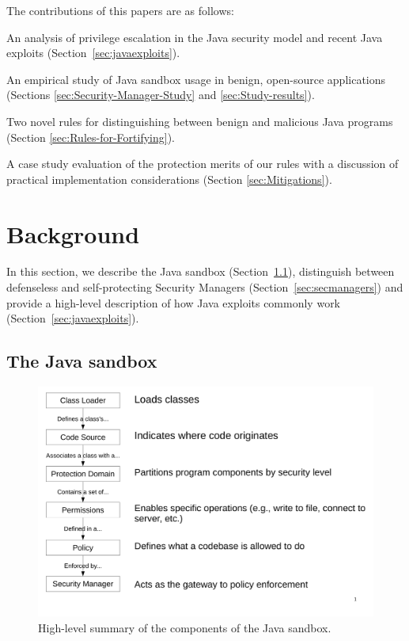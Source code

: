 \documentclass{sig-alternate}
\begin{document}
The contributions of this papers are as follows:
\begin{flushitem}	\setlength{\parskip}{0pt}
  \setlength{\parsep}{0pt}
  \setlength{\itemsep}{0pt}
\item An analysis of privilege escalation in the Java security model and
recent Java exploits (Section~\ref{sec:javaexploits}).
\item An empirical study of Java sandbox usage in benign, open-source applications
(Sections \ref{sec:Security-Manager-Study} and \ref{sec:Study-results}).
\item Two novel rules for distinguishing between benign and malicious Java
programs (Section \ref{sec:Rules-for-Fortifying}).
\item A case study evaluation of the protection merits of our rules with a discussion of practical implementation considerations (Section \ref{sec:Mitigations}).
\end{flushitem}

\section{Background}\label{sec:Background}

In this section, we describe the Java sandbox
(Section~\ref{sec:sandbox}), distinguish between defenseless and self-protecting
Security Managers (Section~\ref{sec:secmanagers}) and provide a high-level
description of how Java exploits commonly work
(Section~\ref{sec:javaexploits}). 

\subsection{The Java sandbox}
\label{sec:sandbox}

\begin{figure}
\includegraphics[width=\columnwidth]{sandbox_overview}
\caption{High-level summary of the components of the Java 
\label{fig:Sandbox-high-level-summary}
sandbox.}
\end{figure}
\end{document}
